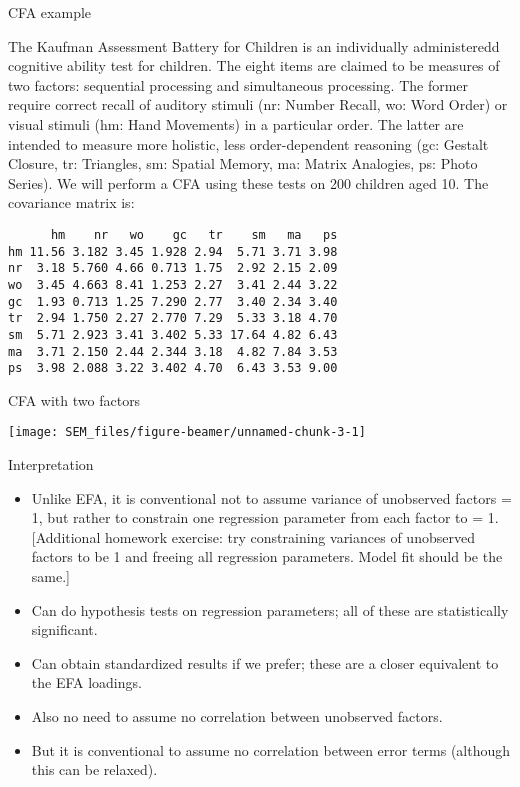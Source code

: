\documentclass[10pt,ignorenonframetext,]{beamer}
\providecommand{\tightlist}{%
\setlength{\itemsep}{0pt}\setlength{\parskip}{0pt}}
\begin{document}
\begin{frame}[fragile]{CFA example}

The Kaufman Assessment Battery for Children is an individually
administeredd cognitive ability test for children. The eight items are
claimed to be measures of two factors: sequential processing and
simultaneous processing. The former require correct recall of auditory
stimuli (nr: Number Recall, wo: Word Order) or visual stimuli (hm: Hand
Movements) in a particular order. The latter are intended to measure
more holistic, less order-dependent reasoning (gc: Gestalt Closure, tr:
Triangles, sm: Spatial Memory, ma: Matrix Analogies, ps: Photo Series).
We will perform a CFA using these tests on 200 children aged 10. The
covariance matrix is:

\begin{verbatim}
      hm    nr   wo    gc   tr    sm   ma   ps
hm 11.56 3.182 3.45 1.928 2.94  5.71 3.71 3.98
nr  3.18 5.760 4.66 0.713 1.75  2.92 2.15 2.09
wo  3.45 4.663 8.41 1.253 2.27  3.41 2.44 3.22
gc  1.93 0.713 1.25 7.290 2.77  3.40 2.34 3.40
tr  2.94 1.750 2.27 2.770 7.29  5.33 3.18 4.70
sm  5.71 2.923 3.41 3.402 5.33 17.64 4.82 6.43
ma  3.71 2.150 2.44 2.344 3.18  4.82 7.84 3.53
ps  3.98 2.088 3.22 3.402 4.70  6.43 3.53 9.00
\end{verbatim}

\end{frame}

\begin{frame}{CFA with two factors}

\begin{center}\texttt{[image: SEM\_files/figure-beamer/unnamed-chunk-3-1]} \end{center}

\end{frame}

\begin{frame}{Interpretation}

\begin{itemize}
\tightlist
\item
  Unlike EFA, it is conventional not to assume variance of unobserved
  factors = 1, but rather to constrain one regression parameter from
  each factor to = 1. {[}Additional homework exercise: try constraining
  variances of unobserved factors to be 1 and freeing all regression
  parameters. Model fit should be the same.{]}
\item
  Can do hypothesis tests on regression parameters; all of these are
  statistically significant.
\item
  Can obtain standardized results if we prefer; these are a closer
  equivalent to the EFA loadings.
\item
  Also no need to assume no correlation between unobserved factors.
\item
  But it is conventional to assume no correlation between error terms
  (although this can be relaxed).
\end{itemize}

\end{frame}
\end{document}
